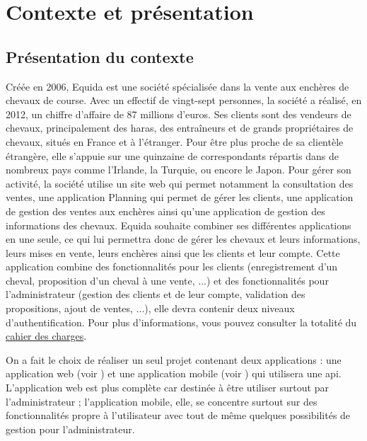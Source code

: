 \chapter{Contexte et présentation}
	\section{Présentation du contexte}

		Créée en 2006, Equida est une société spécialisée dans la vente aux enchères de chevaux de course. Avec un effectif de vingt-sept personnes, la société a réalisé, en 2012, un chiffre d’affaire de 87 millions d’euros. Ses clients sont des vendeurs de chevaux, principalement des haras, des entraîneurs et de grands propriétaires de chevaux, situés en France et à l’étranger. Pour être plus proche de sa clientèle étrangère, elle s’appuie sur une quinzaine de correspondants répartis dans de nombreux pays comme l’Irlande, la Turquie, ou encore le Japon.\newline
		Pour gérer son activité, la société utilise un site web qui permet notamment la consultation des ventes, une application Planning qui permet de gérer les clients, une application de gestion des ventes aux enchères ainsi qu'une application de gestion des informations des chevaux.\newline
		Equida souhaite combiner ses différentes applications en une seule, ce qui lui permettra donc de gérer les chevaux et leurs informations, leurs mises en vente, leurs enchères ainsi que les clients et leur compte.\newline
		Cette application combine des fonctionnalités pour les clients (enregistrement d'un cheval, proposition d'un cheval à une vente, ...) et des fonctionnalités pour l'administrateur (gestion des clients et de leur compte, validation des propositions, ajout de ventes, ...), elle devra contenir deux niveaux d'authentification.\newline
		Pour plus d'informations, vous pouvez consulter la totalité du \href{https://github.com/justine-martin-study/Equida/blob/master/doc/Cahier%20des%20charges.pdf}{cahier des charges}.

		\noindent
		On a fait le choix de réaliser un seul projet contenant deux applications : une application web (voir ) et une application mobile (voir ) qui utilisera une api. L'application web est plus complète car destinée à être utiliser surtout par l'administrateur ; l'application mobile, elle, se concentre surtout sur des fonctionnalités propre à l'utilisateur avec tout de même quelques possibilités de gestion pour l'administrateur.

